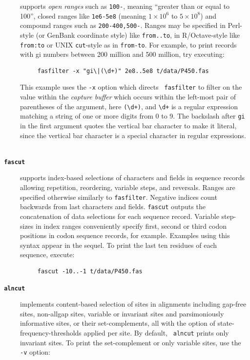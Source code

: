 \documentclass{frontiersSCNS} %
\begin{document}
\begin{description}
supports {\it open ranges} such as {\tt 100-}, meaning ``greater than or
equal to 100'', closed ranges like {\tt 1e6-5e8} (meaning $1 \times
10^{6}$ to $5 \times 10^{8}$) and compound ranges
such as {\tt 200-400,500-}. Ranges may be specified in Perl-style (or
GenBank coordinate style) like {\tt from..to}, in R/Octave-style like
{\tt from:to} or UNIX {\tt cut}-style as in {\tt from-to}. For
example, to print records with gi numbers between 200 million and 500
million, try executing:
\begin{verbatim}
     fasfilter -x "gi\|(\d+)" 2e8..5e8 t/data/P450.fas
\end{verbatim}
\noindent This example uses the {\tt -x} option which directs {\tt
  fasfilter} to filter on the value within the {\it capture buffer}
which occurs within the left-most pair of parentheses of the argument,
here \verb|(\d+)|, and \verb|\d+| is a regular expression matching a
string of one or more digits from 0 to 9. The backslash after
\verb|gi| in the first argument quotes the vertical bar character to
make it literal, since the vertical bar character is a special
character in regular expressions. \\
\\
\item[\texttt{\textbf{  fascut}} ] supports index-based selections of
characters and fields in sequence records allowing repetition,
reordering, variable steps, and reversals.  Ranges are specified
otherwise similarly to {\tt fasfilter}. Negative indices count
backwards from last characters and fields. {\tt fascut} outputs the
concatenation of data selections for each sequence record.  Variable
step-sizes in index ranges conveniently specify first, second or third
codon positions in codon sequence records, for example. Examples using
this syntax appear in the sequel. To print the last ten residues of
each sequence, execute:
\begin{verbatim}
     fascut -10..-1 t/data/P450.fas
\end{verbatim}

\item[\texttt{\textbf{ alncut}} ] implements content-based selection of
  sites in alignments including gap-free sites, non-allgap sites,
  variable or invariant sites and parsimoniously informative sites, or
  their set-complements, all with the option of
  state-frequency-thresholds applied per site. By default, {\tt
    alncut} prints only invariant sites. To print the set-complement
  or only variable sites, use the \verb|-v| option:


\end{description}
\end{document}
